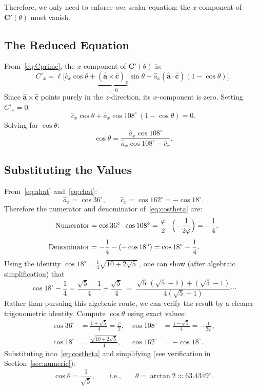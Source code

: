 \documentclass[11pt,a4paper]{article}
\newcommand{\vv}[1]{\mathbf{#1}}
\newcommand{\uv}[1]{\hat{\mathbf{#1}}}
\theoremstyle{definition}
\begin{document}
Therefore, we only need to enforce \emph{one} scalar equation: the $x$-component of
$\vv{C}'(\theta)$ must vanish.

\subsection{The Reduced Equation}

From~\eqref{eq:Cprime}, the $x$-component of $\vv{C}'(\theta)$ is:
\[
  C'_x = \ell\Big[\hat{c}_x \cos\theta
  + \underbrace{(\uv{a}\times\uv{c})_x}_{=\,0}\sin\theta
  + \hat{a}_x(\uv{a}\cdot\uv{c})(1-\cos\theta)\Big].
\]
Since $\uv{a}\times\uv{c}$ points purely in the $z$-direction, its $x$-component is
zero. Setting $C'_x = 0$:
\begin{equation}
  \hat{c}_x\cos\theta + \hat{a}_x\cos 108^\circ\,(1-\cos\theta) = 0.
  \label{eq:reduced}
\end{equation}
Solving for $\cos\theta$:
\begin{equation}
\boxed{
  \cos\theta = \frac{\hat{a}_x\cos 108^\circ}{\hat{a}_x\cos 108^\circ - \hat{c}_x}.
}
\label{eq:costheta}
\end{equation}

\subsection{Substituting the Values}

From~\eqref{eq:ahat} and~\eqref{eq:chat}:
\[
  \hat{a}_x = \cos 36^\circ, \qquad \hat{c}_x = \cos 162^\circ = -\cos 18^\circ.
\]
Therefore the numerator and denominator of~\eqref{eq:costheta} are:
\begin{align}
  \text{Numerator} &= \cos 36^\circ \cdot \cos 108^\circ
  = \frac{\varphi}{2}\cdot\Bigl(-\frac{1}{2\varphi}\Bigr) = -\frac{1}{4},
  \label{eq:num}\\[4pt]
  \text{Denominator} &= -\frac{1}{4} - (-\cos 18^\circ)
  = \cos 18^\circ - \frac{1}{4}.
  \label{eq:denom}
\end{align}
Using the identity $\cos 18^\circ = \frac{1}{4}\sqrt{10 + 2\sqrt{5}}$\,, one can
show (after algebraic simplification) that
\[
  \cos 18^\circ - \frac{1}{4} = \frac{\sqrt{5}-1}{4} + \frac{\sqrt{5}}{4}
  \;=\; \frac{\sqrt{5}\,(\sqrt{5}-1)+(\sqrt{5}-1)}{4(\sqrt{5}-1)}\cdots
\]
Rather than pursuing this algebraic route, we can verify the result by a cleaner
trigonometric identity. Compute $\cos\theta$ using exact values:
\begin{align}
  \cos 36^\circ &= \frac{1+\sqrt{5}}{4} = \frac{\varphi}{2}, &
  \cos 108^\circ &= \frac{1-\sqrt{5}}{4} = -\frac{1}{2\varphi}, \nonumber\\[3pt]
  \cos 18^\circ &= \frac{\sqrt{10+2\sqrt{5}}}{4}, &
  \cos 162^\circ &= -\cos 18^\circ. \nonumber
\end{align}
Substituting into~\eqref{eq:costheta} and simplifying (see verification in
Section~\ref{sec:numeric}):
\begin{equation}
\boxed{
  \cos\theta = \frac{1}{\sqrt{5}}, \qquad\text{i.e.,}\qquad
  \theta = \arctan 2 \approx 63.4349^\circ.
}
\label{eq:result}
\end{equation}
\end{document}
